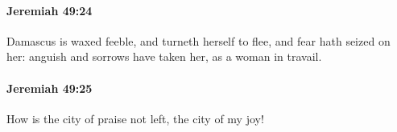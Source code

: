 		\paragraph{Jeremiah 49:24} %
			\label{JEREMIAH-49-24}

			Damascus is waxed feeble, and turneth herself to flee, and fear hath seized on her: anguish and sorrows have taken her, as a woman in travail.


		\paragraph{Jeremiah 49:25} %
			\label{JEREMIAH-49-25}

			How is the city of praise not left, the city of my joy!


